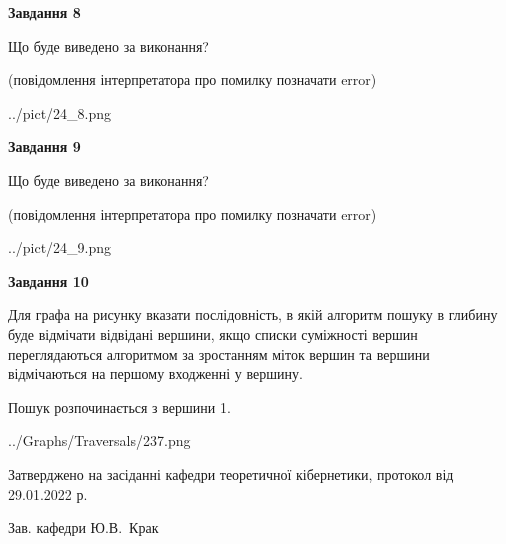 \documentclass[12pt, ukrainian]{article}
\begin{document}
{\begin {large}
{\begin {center}\textbf{Завдання 8}\end {center}}\par
Що буде виведено за виконання?\par
 (повідомлення інтерпретатора про помилку позначати error)\par
\begin{center}
	{../pict/24_8.png}
\end{center}
\newpage

{\begin {center}\textbf{Завдання 9}\end {center}}\par
Що буде виведено за виконання?\par
 (повідомлення інтерпретатора про помилку позначати error)\par
\begin{center}
	{../pict/24_9.png}
\end{center}
\newpage

{\begin {center}\textbf{Завдання 10}\end {center}}\par
Для графа на рисунку вказати послідовність, в якій алгоритм пошуку в глибину буде відмічати відвідані вершини, якщо списки суміжності вершин переглядаються алгоритмом за зростанням міток вершин та вершини відмічаються на першому вход\-женні у вершину.\par
Пошук розпочинається з вершини 1.\par

\begin{center}
	{../Graphs/Traversals/237.png}
\end{center}\par
\newpage


\end {large}
}
{\smallskip \begin {small} Затверджено на засіданні кафедри теоретичної кібернетики, протокол  від   29.01.2022 р.\par\smallskip\smallskip
{\parbox {6.5 cm}{Зав. кафедри \dotfill Ю.В.~Крак}} \end{small}}
\end{document}
